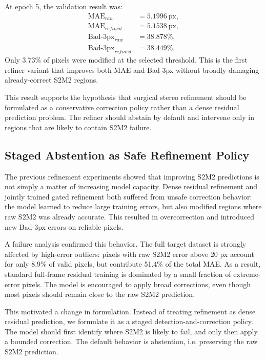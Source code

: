 \documentclass[11pt,a4paper]{article}
\begin{document}
At epoch 5, the validation result was:
\[
\begin{aligned}
\mathrm{MAE}_{raw} &= 5.1996~\mathrm{px}, \\
\mathrm{MAE}_{refined} &= 5.1538~\mathrm{px}, \\
\mathrm{Bad}\text{-}3\mathrm{px}_{raw} &= 38.878\%, \\
\mathrm{Bad}\text{-}3\mathrm{px}_{refined} &= 38.449\%.
\end{aligned}
\]
Only 3.73\% of pixels were modified at the selected threshold. This is the first
refiner variant that improves both MAE and Bad-3px without broadly damaging
already-correct S2M2 regions.

This result supports the hypothesis that surgical stereo refinement should be
formulated as a conservative correction policy rather than a dense residual
prediction problem. The refiner should abstain by default and intervene only in
regions that are likely to contain S2M2 failure.

\subsection{Staged Abstention as Safe Refinement Policy}

The previous refinement experiments showed that improving S2M2 predictions is not
simply a matter of increasing model capacity. Dense residual refinement and
jointly trained gated refinement both suffered from unsafe correction behavior:
the model learned to reduce large training errors, but also modified regions
where raw S2M2 was already accurate. This resulted in overcorrection and
introduced new Bad-3px errors on reliable pixels.

A failure analysis confirmed this behavior. The full target dataset is strongly
affected by high-error outliers: pixels with raw S2M2 error above 20 px account
for only 8.9\% of valid pixels, but contribute 51.4\% of the total MAE. As a
result, standard full-frame residual training is dominated by a small fraction of
extreme-error pixels. The model is encouraged to apply broad corrections, even
though most pixels should remain close to the raw S2M2 prediction.

This motivated a change in formulation. Instead of treating refinement as dense
residual prediction, we formulate it as a staged detection-and-correction policy.
The model should first identify where S2M2 is likely to fail, and only then apply
a bounded correction. The default behavior is abstention, i.e. preserving the raw
S2M2 prediction.
\end{document}
